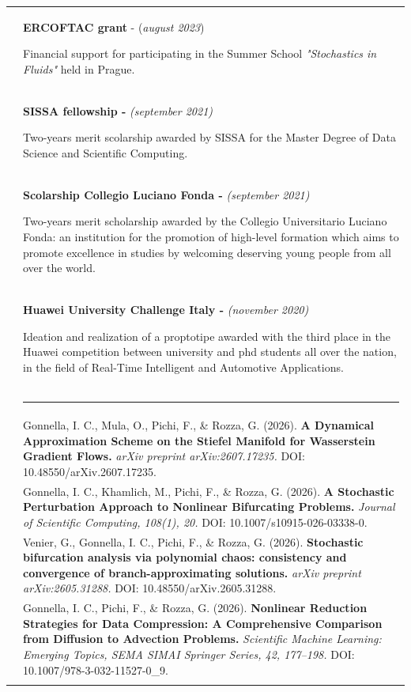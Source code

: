 \documentclass[a4paper]{article}
\newlength{\cvlabelwidth}\setlength{\cvlabelwidth}{88.8bp}
\newlength{\colgap}\setlength{\colgap}{9.5bp}
\newlength{\detailwidth}\setlength{\detailwidth}{\dimexpr\textwidth-\cvlabelwidth-\colgap\relax}
\newlength{\narrowwidth}\setlength{\narrowwidth}{\detailwidth}
\newlength{\cvitemsep}\setlength{\cvitemsep}{4.5bp}
\newcommand{\cvrowend}{\\\noalign{\vskip\cvitemsep}}
\newcommand{\cvbold}[1]{\textbf{\upshape #1}}
\newcommand{\cvlabel}[1]{\leavevmode{\color{cvblue}\upshape\bfseries\fontsize{8.5bp}{10.2bp}\selectfont\strut #1}}
\newcommand{\cvdivider}{\noalign{\vskip 6bp}%
 {\color{cvblue!20}\rule{\cvlabelwidth}{0.6bp}} &
 {\color{cvblue!20}\rule{\narrowwidth}{0.6bp}}\\*[4bp]}
\newcommand{\cvitem}[2]{\cvlabel{#1} & #2\cvrowend}
\newcommand{\cvpublication}[2]{\cvlabel{#1} &
 #2\cvrowend}
\begin{document}
\begin{longtable}{@{}>{\raggedright\arraybackslash}p{\cvlabelwidth}@{\hspace{\colgap}}>{\raggedright\arraybackslash}p{\detailwidth}@{}}
\cvitem{}{\cvbold{ERCOFTAC grant }- (\textit{august 2023})\par\vspace{5.55bp}Financial support for participating in the Summer School \textit{"Stochastics in Fluids" }held in Prague.}

\cvitem{}{\cvbold{SISSA fellowship - }\textit{(september 2021)}\par\vspace{5.55bp}Two-years merit scolarship awarded by SISSA for the Master Degree of Data Science and Scientific Computing.}

\cvitem{}{\cvbold{Scolarship Collegio Luciano Fonda - }\textit{(september 2021)}\par\vspace{5.55bp}Two-years merit scholarship awarded by the Collegio Universitario Luciano Fonda: an institution for the promotion of high-level formation which aims to promote excellence in studies by welcoming deserving young people from all over the world.}

\cvitem{}{\cvbold{Huawei University Challenge Italy - }\textit{(november 2020)}\par\vspace{5.55bp}Ideation and realization of a proptotipe awarded with the third place in the Huawei competition between university and phd students all over the nation, in the field of Real-Time Intelligent and Automotive Applications.}

\cvdivider

\cvpublication{PUBLICATIONS}{Gonnella, I. C., Mula, O., Pichi, F., \& Rozza, G. (2026). \cvbold{A Dynamical Approximation Scheme on the Stiefel Manifold for Wasserstein Gradient Flows.} \textit{arXiv preprint arXiv:2607.17235.} DOI: 10.48550/arXiv.2607.17235.}

\cvpublication{}{Gonnella, I. C., Khamlich, M., Pichi, F., \& Rozza, G. (2026). \cvbold{A Stochastic Perturbation Approach to Nonlinear Bifurcating Problems.} \textit{Journal of Scientific Computing, 108(1), 20.} DOI: 10.1007/s10915-026-03338-0.}

\cvpublication{}{Venier, G., Gonnella, I. C., Pichi, F., \& Rozza, G. (2026). \cvbold{Stochastic bifurcation analysis via polynomial chaos: consistency and convergence of branch-approximating solutions.} \textit{arXiv preprint arXiv:2605.31288.} DOI: 10.48550/arXiv.2605.31288.}

\cvpublication{}{Gonnella, I. C., Pichi, F., \& Rozza, G. (2026). \cvbold{Nonlinear Reduction Strategies for Data Compression: A Comprehensive Comparison from Diffusion to Advection Problems.} \textit{Scientific Machine Learning: Emerging Topics, SEMA SIMAI Springer Series, 42, 177–198.} DOI: 10.1007/978-3-032-11527-0\_9.}


\end{longtable}
\end{document}
